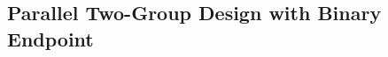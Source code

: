 \documentclass[12pt]{article}
\begin{document}


\subsection{Parallel Two-Group Design with Binary Endpoint}\label{sec:example2}
\end{document}
